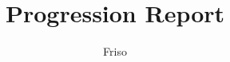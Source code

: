 \documentclass[11pt, a4paper, oneside]{book}
\begin{document}
\title{Progression Report}
\author{Friso}
\date{}
\maketitle


\end{document}
